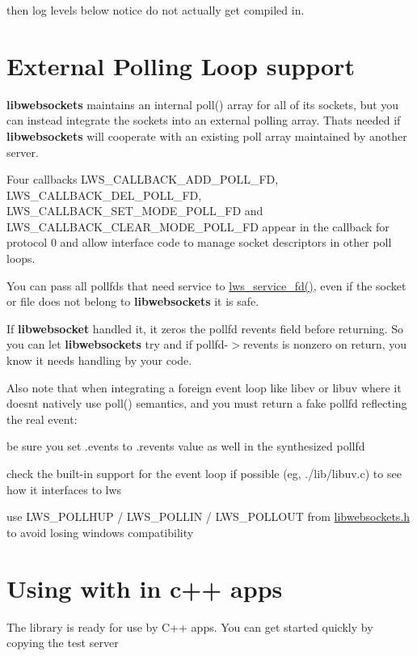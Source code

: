 

then log levels below notice do not actually get compiled in.\hypertarget{md_README.coding_extpoll}{}\section{External Polling Loop support}\label{md_README.coding_extpoll}
{\bfseries libwebsockets} maintains an internal {\ttfamily poll()} array for all of its sockets, but you can instead integrate the sockets into an external polling array. That\textquotesingle{}s needed if {\bfseries libwebsockets} will cooperate with an existing poll array maintained by another server.

Four callbacks {\ttfamily L\+W\+S\+\_\+\+C\+A\+L\+L\+B\+A\+C\+K\+\_\+\+A\+D\+D\+\_\+\+P\+O\+L\+L\+\_\+\+FD}, {\ttfamily L\+W\+S\+\_\+\+C\+A\+L\+L\+B\+A\+C\+K\+\_\+\+D\+E\+L\+\_\+\+P\+O\+L\+L\+\_\+\+FD}, {\ttfamily L\+W\+S\+\_\+\+C\+A\+L\+L\+B\+A\+C\+K\+\_\+\+S\+E\+T\+\_\+\+M\+O\+D\+E\+\_\+\+P\+O\+L\+L\+\_\+\+FD} and {\ttfamily L\+W\+S\+\_\+\+C\+A\+L\+L\+B\+A\+C\+K\+\_\+\+C\+L\+E\+A\+R\+\_\+\+M\+O\+D\+E\+\_\+\+P\+O\+L\+L\+\_\+\+FD} appear in the callback for protocol 0 and allow interface code to manage socket descriptors in other poll loops.

You can pass all pollfds that need service to {\ttfamily \hyperlink{group__service_gad82efa5466d14a9f05aa06416375b28d}{lws\+\_\+service\+\_\+fd()}}, even if the socket or file does not belong to {\bfseries libwebsockets} it is safe.

If {\bfseries libwebsocket} handled it, it zeros the pollfd {\ttfamily revents} field before returning. So you can let {\bfseries libwebsockets} try and if {\ttfamily pollfd-\/$>$revents} is nonzero on return, you know it needs handling by your code.

Also note that when integrating a foreign event loop like libev or libuv where it doesn\textquotesingle{}t natively use poll() semantics, and you must return a fake pollfd reflecting the real event\+:


\begin{DoxyItemize}
\item be sure you set .events to .revents value as well in the synthesized pollfd
\item check the built-\/in support for the event loop if possible (eg, ./lib/libuv.c) to see how it interfaces to lws
\item use L\+W\+S\+\_\+\+P\+O\+L\+L\+H\+UP / L\+W\+S\+\_\+\+P\+O\+L\+L\+IN / L\+W\+S\+\_\+\+P\+O\+L\+L\+O\+UT from \hyperlink{libwebsockets_8h}{libwebsockets.\+h} to avoid losing windows compatibility
\end{DoxyItemize}\hypertarget{md_README.coding_cpp}{}\section{Using with in c++ apps}\label{md_README.coding_cpp}
The library is ready for use by C++ apps. You can get started quickly by copying the test server


